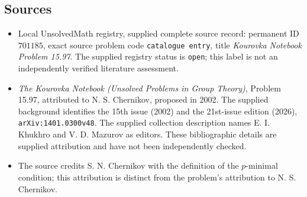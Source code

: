\documentclass[11pt]{article}
\begin{document}
\subsection{Sources}
\begin{itemize}
\item Local UnsolvedMath registry, supplied complete source record: permanent ID \(701185\), exact source problem code \texttt{catalogue entry}, title \emph{Kourovka Notebook Problem 15.97}. The supplied registry status is \texttt{open}; this label is not an independently verified literature assessment.
\item \emph{The Kourovka Notebook (Unsolved Problems in Group Theory)}, Problem 15.97, attributed to N. S. Chernikov, proposed in 2002. The supplied background identifies the 15th issue (2002) and the 21st-issue edition (2026), \texttt{arXiv:1401.0300v48}. The supplied collection description names E. I. Khukhro and V. D. Mazurov as editors. These bibliographic details are supplied attribution and have not been independently checked.
\item The source credits S. N. Chernikov with the definition of the \(p\)-minimal condition; this attribution is distinct from the problem's attribution to N. S. Chernikov.
\end{itemize}
\end{document}
